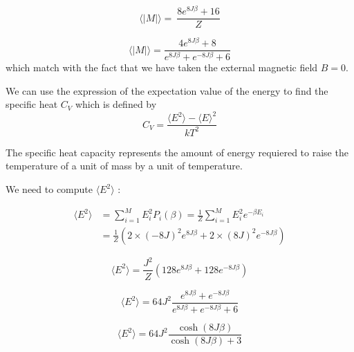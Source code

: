 \documentclass[a4paper, twoside, 11pt]{report}
\theoremstyle{theorem}
\theoremstyle{remark}
\theoremstyle{exemple}
\begin{document}
                \begin{equation*}
                    \boxed{\langle |M| \rangle =\ \frac{8e^{8J\beta}+16}{Z}} 
                    \tag{6} 
                \end{equation*}
                
                \begin{equation*}
                    \langle |M| \rangle = \frac{4e^{8J\beta}+8}{e^{8J\beta}+e^{-8J\beta}+6}
                \end{equation*}
            which match with the fact that we have taken the external magnetic field $B=0$.
            
            We can use the expression of the expectation value of the energy to find the specific heat $C_V$ which is defined by
                \begin{equation*}
                    C_V = \frac{\langle E^2 \rangle - \langle E \rangle ^2}{kT^2}
                \end{equation*}
                
            The specific heat capacity represents the amount of energy requiered to raise the temperature of a unit of mass by a unit of temperature. 
                
            We need to compute $\langle E^2 \rangle$ :
                
                \begin{align*}
                    \langle E^2 \rangle &= \sum\limits_{i=1}^{M}E_i^2P_i(\beta) =\frac{1}{Z}\sum\limits_{i=1}^{M}E_i^2 e^{-\beta E_i} \\
                    &= \frac{1}{Z}\left(2 \times (-8J)^2 e^{8J\beta} + 2 \times (8J)^2 e^{-8J\beta} \right)
                \end{align*}
                
                \begin{equation*}
                    \boxed{\langle E^2 \rangle = \frac{J^2}{Z}\left(128e^{8J\beta} + 128e^{-8J\beta}\right)} 
                    \tag{7}
                \end{equation*}
                
                \begin{equation*}
                    \langle E^2 \rangle = 64J^2 \frac{e^{8J\beta} + e^{-8J\beta}}{e^{8J\beta} + e^{-8J\beta} + 6}
                \end{equation*}
                
                \begin{equation*}
                    \langle E^2 \rangle = 64J^2 \frac{\cosh(8J\beta)}{\cosh(8J\beta) +3} \tag{7'}
                \end{equation*}
            
\end{document}

